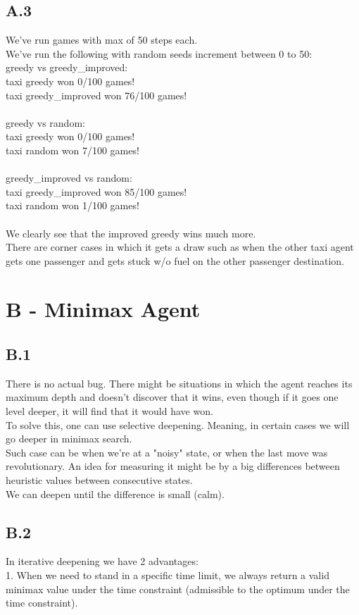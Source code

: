 \documentclass[12pt]{article}
\begin{document}
\subsection*{A.3}
We've run games with max of 50 steps each.\\
We've run the following with random seeds increment between 0 to 50:\\
greedy vs greedy\_improved:\\
taxi greedy won 0/100 games!\\
taxi greedy\_improved won 76/100 games!\\
\\
greedy vs random:\\
taxi greedy won 0/100 games!\\
taxi random won 7/100 games!\\
\\
greedy\_improved vs random:\\
taxi greedy\_improved won 85/100 games!\\
taxi random won 1/100 games!\\
\\
We clearly see that the improved greedy wins much more.\\
There are corner cases in which it gets a draw such as when the other taxi agent gets one passenger and gets stuck w/o fuel on the other passenger destination.

\section*{B - Minimax Agent}

\subsection*{B.1}
There is no actual bug. There might be situations in which the agent reaches its maximum depth and doesn't discover that it wins, even though if it goes one level deeper, it will find that it would have won.\\
To solve this, one can use selective deepening. Meaning, in certain cases we will go deeper in minimax search.\\
Such case can be when we're at a "noisy" state, or when the last move was revolutionary. An idea for measuring it might be by a big differences between heuristic values between consecutive states.\\
We can deepen until the difference is small (calm).

\subsection*{B.2}
In iterative deepening we have 2 advantages:\\
1. When we need to stand in a specific time limit, we always return a valid minimax value under the time constraint (admissible to the optimum under the time constraint).\\
\end{document}
